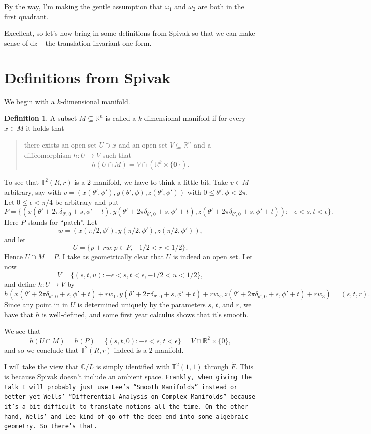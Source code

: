 \documentclass{article}
\theoremstyle{definition}
\newtheorem{defi}{Definition}
\begin{document}
By the way, I'm making the gentle assumption that $\omega_1$ and $\omega_2$ are both in the first quadrant.

Excellent, so let's now bring in some definitions from Spivak so that we can make sense of $\mathrm{d}z$ -- the translation invariant one-form.
\section{Definitions from Spivak}
We begin with a $k$-dimensional manifold.
\begin{defi}
  A subset $M\subseteq\mathbb{R}^n$ is called a $k$-dimensional manifold if for
  every $x\in M$ it holds that
  \begin{quotation}
    there exists an open set $U\ni x$ and an open set $V\subseteq\mathbb{R}^n$ and
    a diffeomorphism $h:U\to V$ such that
    \[h(U\cap M)=V\cap(\mathbb{R}^k\times\{\mathbf{0}\}).\]
  \end{quotation}
\end{defi}
To see that $\mathbb{T}^2(R,r)$ is a $2$-manifold, we have to think a little bit. Take $v\in M$ arbitrary, say with $v=(x(\theta',\phi'),y(\theta',\phi),z(\theta',\phi'))$ with $0\leq\theta',\phi<2\pi$. Let $0\leq\epsilon<\pi/4$ be arbitrary and put
\[P=\{(x(\theta'+2\pi\delta_{\theta',0}+s,\phi'+t),y(\theta'+2\pi\delta_{\theta',0}+s,\phi'+t),z(\theta'+2\pi\delta_{\theta',0}+s,\phi'+t)):-\epsilon<s,t<\epsilon\}.\]
Here $P$ stands for ``patch''. Let
\[w=(x(\pi/2,\phi'),y(\pi/2,\phi'),z(\pi/2,\phi')),\]
and let
\[U=\{p+rw:p\in P,-1/2<r<1/2\}.\]
Hence $U\cap M=P$. I take as geometrically clear that $U$ is indeed an open set. Let now
\[V=\{(s,t,u):-\epsilon<s,t<\epsilon,-1/2<u<1/2\},\]
and define $h:U\to V$ by
\[h(x(\theta'+2\pi\delta_{\theta',0}+s,\phi'+t)+rw_1,y(\theta'+2\pi\delta_{\theta',0}+s,\phi'+t)+rw_2,z(\theta'+2\pi\delta_{\theta',0}+s,\phi'+t)+rw_3)=(s,t,r).\]
Since any point in in $U$ is determined uniquely by the parameters $s$, $t$, and $r$, we have that $h$ is well-defined, and some first year calculus shows that it's smooth.

We see that
\[h(U\cap M)=h(P)=\{(s,t,0):-\epsilon<s,t<\epsilon\}=V\cap\mathbb{R}^2\times\{0\},\]
and so we conclude that $\mathbb{T}^2(R,r)$ indeed is a $2$-manifold.

I will take the view that $\mathbb{C}/L$ is simply identified with $\mathbb{T}^2(1,1)$ through $\tilde{F}$. This is because Spivak doesn't include an ambient space. {\tt Frankly, when giving the talk I will probably just use Lee's ``Smooth Manifolds'' instead or better yet Wells' ``Differential Analysis on Complex Manifolds'' because it's a bit difficult to translate notions all the time. On the other hand, Wells' and Lee kind of go off the deep end into some algebraic geometry. So there's that.}
\end{document}
